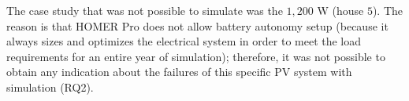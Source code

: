 The case study that was not possible to simulate was the $1,200$ W (house $5$). The reason is that HOMER Pro does not allow battery autonomy setup (because it always sizes and optimizes the electrical system in order to meet the load requirements for an entire year of simulation); therefore, it was not possible to obtain any indication about the failures of this specific PV system with simulation (RQ2).  

%
%
%

